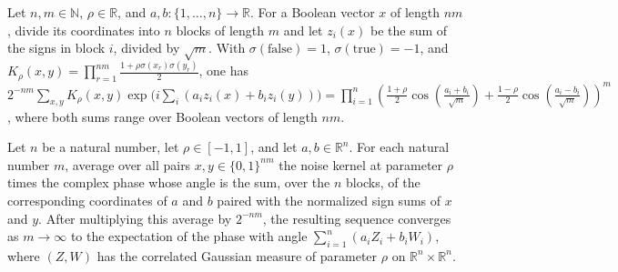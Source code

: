 \begin{lemma}
\label{BooleanAnalysis.GaussianSpace.sum_noiseKernel_normalizedCubeBlocks_phase}
\leanok
{}
Let $n,m\in\mathbb N$, $\rho\in\mathbb R$, and $a,b\colon\{1,\ldots,n\}\to\mathbb R$.
For a Boolean vector $x$ of length $nm$, divide its coordinates into $n$ blocks of
length $m$ and let $z_i(x)$ be the sum of the signs in block $i$, divided by $\sqrt m$.
With $\sigma(\mathrm{false})=1$, $\sigma(\mathrm{true})=-1$, and
$K_\rho(x,y)=\prod_{r=1}^{nm}\frac{1+\rho\sigma(x_r)\sigma(y_r)}2$, one has
$2^{-nm}\sum_{x,y}K_\rho(x,y)\exp\!\bigl(i\sum_i(a_i z_i(x)+b_i
z_i(y))\bigr)=\prod_{i=1}^n\left(\frac{1+\rho}{2}\cos\!\left(\frac{a_i+b_i}{\sqrt
m}\right)+\frac{1-\rho}{2}\cos\!\left(\frac{a_i-b_i}{\sqrt m}\right)\right)^m$, where
both sums range over Boolean vectors of length $nm$.
\end{lemma}

\begin{lemma}
\label{BooleanAnalysis.GaussianSpace.tendsto_sum_noiseKernel_normalizedCubeBlocks_phase}
\leanok
{}
Let $n$ be a natural number, let $\rho\in[-1,1]$, and let $a,b\in\mathbb R^n$. For each
natural number $m$, average over all pairs $x,y\in\{0,1\}^{nm}$ the noise kernel at
parameter $\rho$ times the complex phase whose angle is the sum, over the $n$ blocks, of
the corresponding coordinates of $a$ and $b$ paired with the normalized sign sums of $x$
and $y$. After multiplying this average by $2^{-nm}$, the resulting sequence converges
as $m\to\infty$ to the expectation of the phase with angle $\sum_{i=1}^n(a_i Z_i+b_i
W_i)$, where $(Z,W)$ has the correlated Gaussian measure of parameter $\rho$ on $\mathbb
R^n\times\mathbb R^n$.
\end{lemma}
